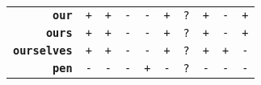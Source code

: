 \documentclass{article}
\begin{document}
\begin{minipage}{\textwidth}
{\begin{tabular}{|r|c|c|c|c|c|c|c|c|c|}
    \textbf{\texttt{our}} & \texttt{+}
    & \texttt{+} & \texttt{-}
    & \texttt{-} & \texttt{+}
    & \texttt{?} & \texttt{+}
    & \texttt{-} & \texttt{+} \\
    \textbf{\texttt{ours}} & \texttt{+}
    & \texttt{+} & \texttt{-}
    & \texttt{-} & \texttt{+}
    & \texttt{?} & \texttt{+}
    & \texttt{-} & \texttt{+} \\
    \textbf{\texttt{ourselves}} & \texttt{+}
    & \texttt{+} & \texttt{-}
    & \texttt{-} & \texttt{+}
    & \texttt{?} & \texttt{+}
    & \texttt{+} & \texttt{-} \\
    \textbf{\texttt{pen}} & \texttt{-}
    & \texttt{-} & \texttt{-}
    & \texttt{+} & \texttt{-}
    & \texttt{?} & \texttt{-}
    & \texttt{-} & \texttt{-} \\
    \hline
  \end{tabular}
  }
\end{minipage}
\bigbreak
\bigbreak
\bigbreak
\end{document}
